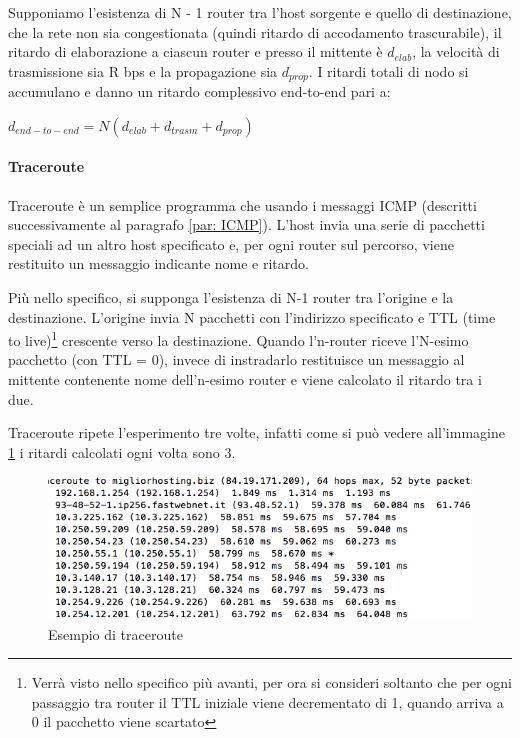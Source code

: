 \documentclass[11pt,a4paper]{article}
\begin{document}
Supponiamo l'esistenza di N - 1 router tra l'host sorgente e quello di destinazione, che la rete non sia congestionata (quindi ritardo di accodamento trascurabile), il ritardo di elaborazione a ciascun router e presso il mittente è $d_{elab}$, la velocità di trasmissione sia R bps e la propagazione sia $d_{prop}$. I ritardi totali di nodo si accumulano e danno un ritardo complessivo end-to-end pari a:
\begin{center}
	$d_{end-to-end} = N(d_{elab} + d_{trasm} + d_{prop})$
\end{center}

\paragraph{Traceroute}
Traceroute è un semplice programma che usando i messaggi ICMP (descritti successivamente al paragrafo \ref{par: ICMP}). L'host invia una serie di pacchetti speciali ad un altro host specificato e, per ogni router sul percorso, viene restituito un messaggio indicante nome e ritardo.

Più nello specifico, si supponga l'esistenza di N-1 router tra l'origine e la destinazione. L'origine invia N pacchetti con l'indirizzo specificato e TTL (time to live)\footnote{Verrà visto nello specifico più avanti, per ora si consideri soltanto che per ogni passaggio tra router il TTL iniziale viene decrementato di 1, quando arriva a 0 il pacchetto viene scartato} crescente verso la destinazione. Quando l'n-router riceve l'N-esimo pacchetto (con TTL = 0), invece di instradarlo restituisce un messaggio al mittente contenente nome dell'n-esimo router e viene calcolato il ritardo tra i due.

Traceroute ripete l'esperimento tre volte, infatti come si può vedere all'immagine \ref{fig: 083} i ritardi calcolati ogni volta sono 3.
\begin{figure}
	\begin{center}
		\includegraphics[scale=1]{img/083.png}
		\caption{Esempio di traceroute}
		\label{fig: 083}
	\end{center} 
\end{figure}
\end{document}
